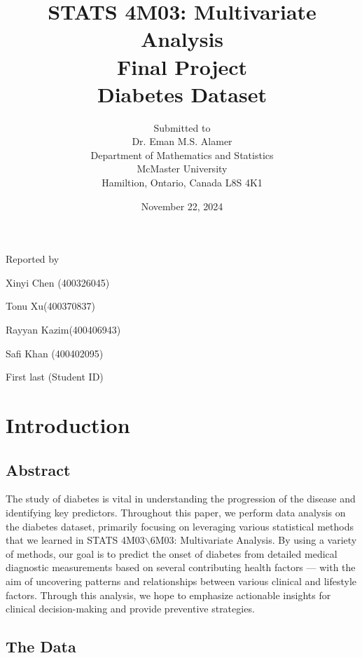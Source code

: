 \documentclass[12pt]{article}
\begin{document}
\title{STATS 4M03: Multivariate Analysis\\ Final Project \\ Diabetes Dataset }

\author{Submitted to\\ Dr. Eman M.S. Alamer 
\\Department of Mathematics and Statistics
\\McMaster University\\Hamiltion, Ontario, Canada L8S 4K1}
\date {November 22, 2024}


\maketitle

 \centerline{Reported by}
 \centerline{Xinyi Chen (400326045)}
  \centerline{Tonu Xu(400370837)}
   \centerline{Rayyan Kazim(400406943)}
    \centerline{Safi Khan (400402095)}
     \centerline{First last (Student ID)}


\newpage
\section{Introduction}
\subsection{Abstract}

\begin{indent} 

The study of diabetes is vital in understanding the progression of the disease and identifying key predictors. Throughout this paper, we perform data analysis on the diabetes dataset, primarily focusing on leveraging various statistical methods that we learned in STATS 4M03$\backslash$6M03: Multivariate Analysis. By using a variety of methods, our goal is to predict the onset of diabetes from detailed medical diagnostic measurements based on several contributing health factors --- with the aim of uncovering patterns and relationships between various clinical and lifestyle factors. Through this analysis, we hope to emphasize actionable insights for clinical decision-making and provide preventive strategies. 

\end{indent}

\subsection{The Data}
\end{document}

